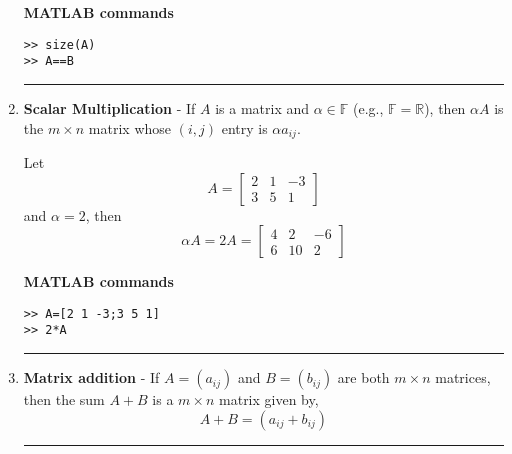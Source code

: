 \begin{enumerate}
\textbf{MATLAB commands}
\begin{verbatim}
>> size(A)
>> A==B
\end{verbatim}

\rule[0.01in]{\textwidth}{0.0025in}
















\item \textbf{Scalar Multiplication} - If $A$ is a matrix and $\alpha \in \mathbb{F}$ (e.g., $\mathbb{F} = \mathbb{R}$), then $\alpha A$ is the $m \times n$ matrix whose $(i,j)$ entry is $\alpha a_{ij}$.

\begin{example}
Let \[ A = \begin{bmatrix} 2 & 1 & -3 \\ 3 & 5 &1\end{bmatrix} \] and $\alpha =2$, then \[  \alpha A = 2A= \begin{bmatrix} 4 & 2 & -6 \\ 6 & 10 & 2 \end{bmatrix} \] 


\textbf{MATLAB commands}
\begin{verbatim}
>> A=[2 1 -3;3 5 1]
>> 2*A
\end{verbatim}



\end{example}

\rule[0.01in]{\textwidth}{0.0025in}


















\item \textbf{Matrix addition} - If $A = (a_{ij})$ and $B = (b_{ij})$ are both $m \times n$ matrices, then the sum $A+B$ is a $m \times n$ matrix given by, 
\[  A+B = (a_{ij} + b_{ij}) \] 


\rule[0.01in]{\textwidth}{0.0025in}





















\end{enumerate}
